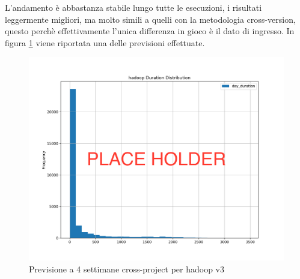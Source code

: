 \documentclass[%
    corpo=12pt,
    twoside,
    oldstyle,
    autoretitolo,
    greek,
    evenboxes,
]{toptesi}
\begin{document}
\begin{center}
   \label{tab:cross_project_hadoop}
\end{center}
L'andamento è abbastanza stabile lungo tutte le esecuzioni, i risultati leggermente migliori, ma molto simili a quelli con la metodologia cross-version, questo perchè effettivamente l'unica differenza in gioco è il dato di ingresso. In figura \ref{fig:hadoop_cp_nn_4w} viene riportata una delle previsioni effettuate.
\begin{figure}[!ht]
  \includegraphics[width=\linewidth]{figure/place_holder.png}
  \caption{Previsione a 4 settimane cross-project per hadoop v3}
  \label{fig:hadoop_cp_nn_4w}
\end{figure}
\end{document}
